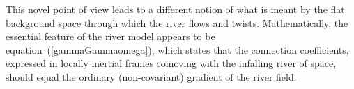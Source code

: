 \documentclass[twocolumn,showpacs,preprintnumbers,amsmath,amssymb,prb]{revtex4}
\begin{document}
This novel point of view
leads to a different
notion of what is meant by the flat background space
through which the river flows and twists.
Mathematically, the essential feature of the river model
appears to be
equation~(\ref{gammaGammaomega}),
which states that the connection coefficients,
expressed in locally inertial frames
comoving with the infalling river of space,
should equal the ordinary (non-covariant) gradient of the river field.




\end{document}
